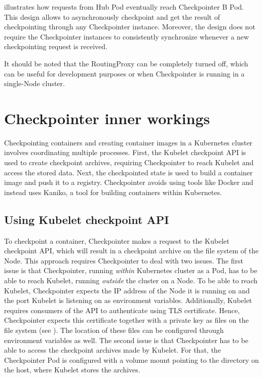 \documentclass[
  digital,     %
  oneside,     %
  nosansbold,  %
  nocolorbold, %
  lof,         %
  nolot,         %
]{fithesis4}
\begin{document}
 illustrates how requests from Hub Pod eventually reach Checkpointer B Pod. This design allows to asynchronously checkpoint and get the result of checkpointing through any Checkpointer instance. Moreover, the design does not require the Checkpointer instances to consistently synchronize whenever a new checkpointing request is received.

It should be noted that the RoutingProxy can be completely turned off, which can be useful for development purposes or when Checkpointer is running in a single-Node cluster.

\section{Checkpointer inner workings}
Checkpointing containers and creating container images in a Kubernetes cluster involves coordinating multiple processes. First, the Kubelet checkpoint API is used to create checkpoint archives, requiring Checkpointer to reach Kubelet and access the stored data. Next, the checkpointed state is used to build a container image and push it to a registry. Checkpointer avoids using tools like Docker and instead uses Kaniko, a tool for building containers within Kubernetes.


\subsection{Using Kubelet checkpoint API}
To checkpoint a container, Checkpointer makes a request to the Kubelet checkpoint API, which will result in a checkpoint archive on the file system of the Node. This approach requires Checkpointer to deal with two issues. The first issue is that Checkpointer, running \emph{within} Kubernetes cluster as a Pod, has to be able to reach Kubelet, running \emph{outside} the cluster on a Node. To be able to reach Kubelet, Checkpointer expects the IP address of the Node it is running on and the port Kubelet is listening on as environment variables. Additionally, Kubelet requires consumers of the API to authenticate using TLS certificate. Hence, Checkpointer expects this certificate together with a private key as files on the file system (see ). The location of these files can be configured through environment variables as well. The second issue is that Checkpointer has to be able to access the checkpoint archives made by Kubelet. For that, the Checkpointer Pod is configured with a volume mount pointing to the directory on the host, where Kubelet stores the archives.
\end{document}
